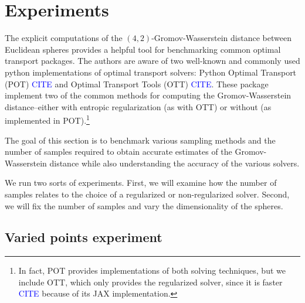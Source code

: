\documentclass{article}
\begin{document}
\section{Experiments}
The explicit computations of the $(4, 2)$-Gromov-Wasserstein distance between Euclidean spheres provides a helpful tool for benchmarking common optimal transport packages.
The authors are aware of two well-known and commonly used python implementations of optimal transport solvers: Python Optimal Transport (POT) \textcolor{blue}{CITE} and Optimal Transport Tools (OTT) \textcolor{blue}{CITE}.
These package implement two of the common methods for computing the Gromov-Wasserstein distance--either with entropic regularization (as with OTT) or without (as implemented in POT).\footnote{In fact, POT provides implementations of both solving techniques, but we include OTT, which only provides the regularized solver, since it is faster \textcolor{blue}{CITE} because of its JAX implementation.}

The goal of this section is to benchmark various sampling methods and the number of samples required to obtain accurate estimates of the Gromov-Wasserstein distance while also understanding the accuracy of the various solvers.

We run two sorts of experiments.
First, we will examine how the number of samples relates to the choice of a regularized or non-regularized solver.
Second, we will fix the number of samples and vary the dimensionality of the spheres.

\subsection{Varied points experiment}
\end{document}

